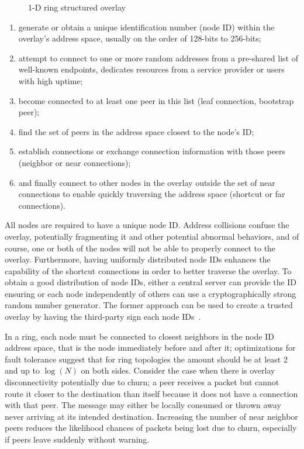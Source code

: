 \begin{figure}
\centering
{}
\caption{1-D ring structured overlay}
\label{fig:ring_overlay}
\end{figure}

\begin{enumerate}

\item generate or obtain a unique identification number (node ID) within the
overlay's address space, usually on the order of 128-bits to 256-bits;

\item attempt to connect to one or more random addresses from a pre-shared list
of well-known endpoints, dedicates resources from a service provider or users
with high uptime;

\item become connected to at least one peer in this list (leaf connection,
bootstrap peer);

\item find the set of peers in the address space closest to the node's ID;

\item establish connections or exchange connection information with those peers
(neighbor or near connections);

\item and finally connect to other nodes in the overlay outside the set of near
connections to enable quickly traversing the address space (shortcut or far
connections).

\end{enumerate}

All nodes are required to have a unique node ID.  Address collisions confuse
the overlay, potentially fragmenting it and other potential abnormal behaviors,
and of course, one or both of the nodes will not be able to properly connect to
the overlay.  Furthermore, having uniformly distributed node IDs enhances the
capability of the shortcut connections in order to better traverse the overlay.
To obtain a good distribution of node IDs, either a central server can provide
the ID ensuring or each node independently of others can use a
cryptographically strong random number generator.  The former approach can be
used to create a trusted overlay by having the third-party sign each node
IDs~\cite{secure_routing}.

In a ring, each node must be connected to closest neighbors in the node ID
address space, that is the node immediately before and after it; optimizations
for fault tolerance suggest that for ring topologies the amount should be at
least 2 and up to $\log(N)$ on both sides.  Consider the case when there is
overlay disconnectivity potentially due to churn; a peer receives a packet but
cannot route it closer to the destination than itself because it does not have
a connection with that peer.  The message may either be locally consumed or
thrown away never arriving at its intended destination.  Increasing the number
of near neighbor peers reduces the likelihood chances of packets being lost due
to churn, especially if peers leave suddenly without warning.

